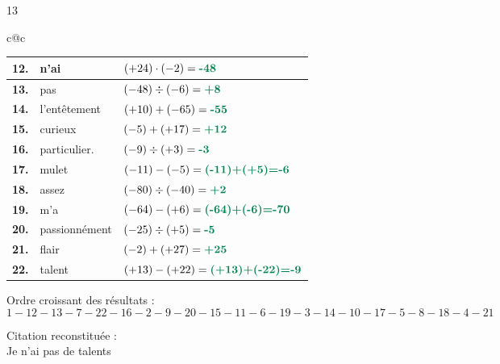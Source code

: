 \begin{solution}{13}
\begin{center}
\begin{tabular}{c@{\hspace{8mm}}c}
  \begin{tabular}{|>{\centering\arraybackslash}p{6mm}|p{2.5cm}|p{4.0cm}|}
    \hline
    \cellcolor{gray!40}\textbf{12.} &n'ai& $(+24)\cdot(-2)=\rc{-48}$             \\ \hline
    \cellcolor{gray!40}\textbf{13.} &pas& $(-48)\div(-6)=\rc{+8}$               \\ \hline
    \cellcolor{gray!40}\textbf{14.} &l'entêtement& $(+10)+(-65)=\rc{-55}$                \\ \hline
    \cellcolor{gray!40}\textbf{15.} &curieux& $(-5)+(+17)=\rc{+12}$                 \\ \hline
    \cellcolor{gray!40}\textbf{16.} &particulier.& $(-9)\div(+3)=\rc{-3}$                \\ \hline
    \cellcolor{gray!40}\textbf{17.} &mulet& $(-11)-(-5)=\rc{(-11)+(+5)=-6}$       \\ \hline
    \cellcolor{gray!40}\textbf{18.} &assez& $(-80)\div(-40)=\rc{+2}$              \\ \hline
    \cellcolor{gray!40}\textbf{19.} &m'a& $(-64)-(+6)=\rc{(-64)+(-6)=-70}$      \\ \hline
    \cellcolor{gray!40}\textbf{20.} &passionnément& $(-25)\div(+5)=\rc{-5}$               \\ \hline
    \cellcolor{gray!40}\textbf{21.} &flair& $(-2)+(+27)=\rc{+25}$                 \\ \hline
    \cellcolor{gray!40}\textbf{22.} &talent& $(+13)-(+22)=\rc{(+13)+(-22)=-9}$     \\ \hline
  \end{tabular}

\end{tabular}
\end{center}

\bigskip
\noindent Ordre croissant des résultats :
\[
  1 - 12 - 13 - 7 - 22 - 16 - 2 - 9 - 20 - 15 - 11 - 6 - 19 - 3 - 14 - 10 - 17 - 5 - 8 - 18 - 4 - 21
\]

\bigskip
\noindent Citation reconstituée :\\
Je n'ai pas de talents 


\end{solution}
